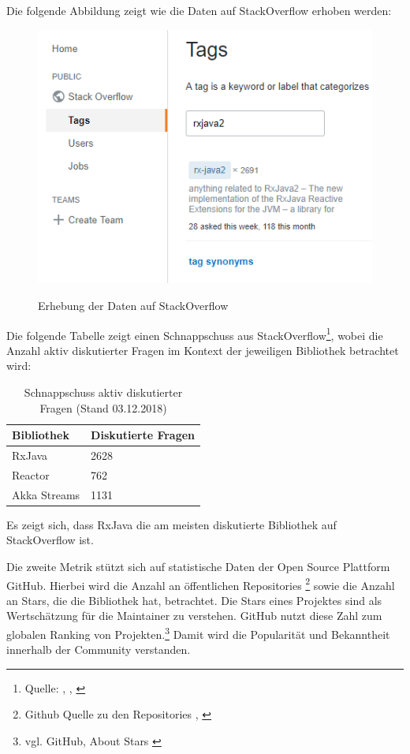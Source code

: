 Die folgende Abbildung zeigt wie die Daten auf StackOverflow erhoben werden:
\begin{center}
\centering
\begin{figure}[H]
\caption{Erhebung der Daten auf StackOverflow}
\includegraphics[width=.5\textwidth]{media/stackoverflow_rxjava}
\label{stackoverflow:rxjava}
\end{figure}
\end{center}

Die folgende Tabelle zeigt einen Schnappschuss aus StackOverflow\footnote{Quelle: \cite{web:site:stackoverflow:rxjava}, \cite{web:site:stackoverflow:akka}, \cite{web:site:stackoverflow:akka}}, wobei die Anzahl aktiv diskutierter Fragen im Kontext der jeweiligen Bibliothek betrachtet wird:

\begin{table}[H]
\centering
\caption{Schnappschuss aktiv diskutierter Fragen (Stand 03.12.2018)}
\begin{tabular}{|l|l|}
\hline
\rowcolor[HTML]{00A99D} 
Bibliothek   & Diskutierte Fragen \\ \hline
RxJava       & 2628   \\ \hline
Reactor     & 762    \\ \hline
Akka Streams & 1131   \\ \hline
\end{tabular}
\label{stackoverflow_snapshot}
\end{table}

Es zeigt sich, dass RxJava die am meisten diskutierte Bibliothek auf StackOverflow ist.

Die zweite Metrik stützt sich auf statistische Daten der Open Source Plattform GitHub. Hierbei wird die Anzahl an öffentlichen Repositories \footnote{Github Quelle zu den Repositories \cite{web:site:github:count:repo:rxjava} \cite{web:site:github:count:repo:reactor}, \cite{web:site:github:count:repo:akka}} sowie die Anzahl an Stars, die die Bibliothek hat, betrachtet. Die Stars eines Projektes sind als Wertschätzung für die Maintainer zu verstehen. GitHub nutzt diese Zahl zum globalen Ranking von Projekten.\footnote{vgl. GitHub, About Stars \cite{web:site:github:about_stars}} Damit wird die Popularität und Bekanntheit innerhalb der Community verstanden.

